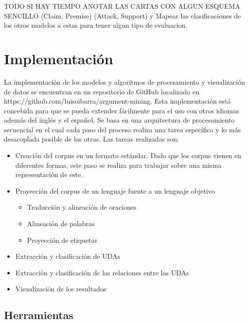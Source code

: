 TODO SI HAY TIEMPO ANOTAR LAS CARTAS CON ALGUN ESQUEMA SENCILLO (Claim, Premise) (Attack, Support) y Mapear 
las clasificaciones de los otros modelos a estas para tener algun tipo de evaluacion.

\section{Implementación}

La implementación de los modelos y algoritmos de procesamiento y visualización de datos se encuentran en 
un repositorio de GitHub localizado en https://github.com/luisoibarra/argument-mining. Esta implementación
está concebida para que se pueda extender fácilmente para el uso con otros idiomas además del inglés y el 
español. Se basa en una arquitectura de procesamiento secuencial en el cual cada paso del proceso realiza
una tarea específica y lo más desacoplada posible de las otras. Las tareas realizadas son:

\begin{itemize}
    \item Creación del corpus en un formato estándar. Dado que los corpus vienen en diferentes formas, este paso se realiza para trabajar sobre una misma representación de este.
    \item Proyección del corpus de un lenguaje fuente a un lenguaje objetivo
    \begin{itemize}
        \item Traducción y alineación de oraciones
        \item Alineación de palabras
        \item Proyección de etiquetas
    \end{itemize}
    \item Extracción y clasificación de UDAs
    \item Extracción y clasificación de las relaciones entre las UDAs
    \item Visualización de los resultados
\end{itemize}

\subsection{Herramientas}

